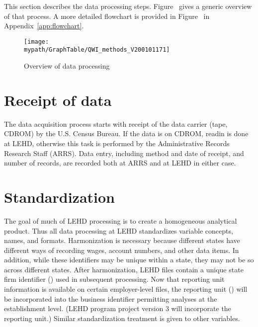 
%
%


This section describes the data processing steps. Figure~ gives a
generic overview 
of that process. A more detailed flowchart is provided in
Figure~ in Appendix~\ref{app:flowchart}.

\begin{figure}[htbp]
\begin{center}
\centerline{\texttt{[image: \\mypath/GraphTable/QWI\_methods\_V200101171]}}
\caption{Overview of data processing\label{fig1}}
\end{center}
\end{figure}


\section{Receipt of data}

The data acquisition process starts with receipt of the data carrier (tape, 
CDROM) by the U.S. Census Bureau. If the data is on CDROM, readin is done
at LEHD, otherwise this task is performed by the 
Administrative Records Research Staff (ARRS).  Data entry, 
including method and date of receipt, and number of records, are recorded
both at ARRS and at LEHD in either case.

\section{Standardization}

The goal of much of LEHD processing is to create a homogeneous analytical 
product. Thus all data processing at LEHD standardizes variable concepts, 
names, and formats. Harmonization is necessary because different states have 
different ways of recording wages,  account numbers, and other data items. 
In addition, while these identifiers may be unique within a state, they may 
not be so across different states. After harmonization, LEHD files contain a 
unique state firm identifier () used in subsequent processing. Now that 
 reporting unit information is available on certain employer-level files, 
the reporting unit () will be incorporated into the business identifier 
permitting analyses at the establishment level. (LEHD program  project 
version 3 will incorporate the reporting unit.) Similar standardization 
treatment is given to other variables. 


